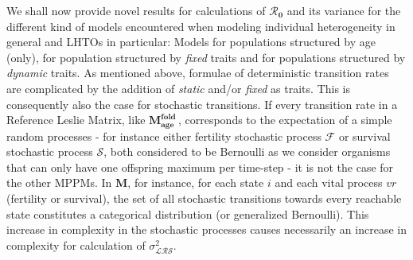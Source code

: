 \documentclass[10pt,a4paper]{article}
\newcommand{\M}{$\mathbf{M}$}
\newcommand{\lam}{$\lambda$}
\newcommand{\Rzero}{$\boldsymbol{\mathcal{R}_{0}}$  }
\newcommand{\LRO}{$\mathcal{LRS}$}
\newcommand{\Ma}{$\mathbf{M^{fold}_{age}}$}
\newcommand{\vLRO}{$\sigma_{\mathrm{\mathcal{LRS}}}^2$}
\begin{document}
We shall now provide novel results for calculations of \Rzero and its variance for the different kind of models encountered when modeling individual heterogeneity in general and LHTOs in particular: Models for populations structured by age (only), for population structured by \emph{fixed} traits and for populations structured by \emph{dynamic} traits. 
As mentioned above, formulae of deterministic transition rates are complicated by the addition of \emph{static} and/or \emph{fixed} as traits. This is consequently also the case for stochastic transitions. If every transition rate in a Reference Leslie Matrix, like \Ma\,, corresponds to the expectation of a simple random processes - for instance either fertility stochastic process $\mathcal{F}$ or survival stochastic process $\mathcal{S}$, both considered to be Bernoulli as we consider organisms that can only have one offspring maximum per time-step - it is not the case for the other MPPMs. In \M, for instance, for each state $i$ and each vital process $vr$ (fertility or survival), the set of all stochastic transitions towards every reachable state %
constitutes a categorical distribution (or generalized Bernoulli). 
This increase in complexity in the stochastic processes causes necessarily an increase in complexity for calculation of \vLRO.
\end{document}
